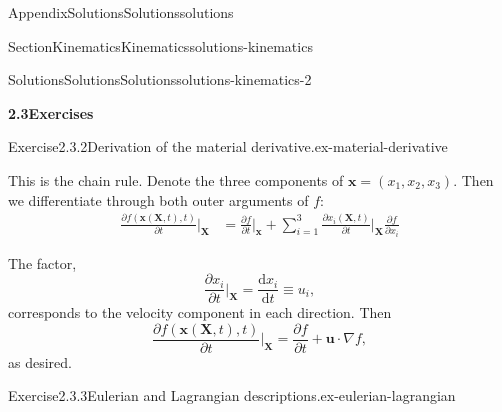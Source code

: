 \documentclass[oneside,10pt,]{book}
\newcommand{\ptxappendixperiodchapter}{}
\numberwithin{equation}{section}
\providecommand\phantomsection{}
\newcommand{\de}{\mathrm{d}}
\newcommand{\dd}[2]{\frac{\de#1}{\de#2}}
\newcommand{\pd}[2]{\frac{\partial#1}{\partial#2}}
\newcommand{\bx}{\boldsymbol{x}}
\newcommand{\bX}{\boldsymbol{X}}
\newcommand{\bu}{\boldsymbol{u}}
\begin{document}
%
\appendix%
\addtocontents{toc}{\protect\renewcommand{\protect\ptxappendixperiodchapter}{.}}%
%
\clearpage\phantomsection%
%
%
%
\typeout{************************************************}
\typeout{************************************************}
%
\begin{appendixptx}{Appendix}{Solutions}{}{Solutions}{}{}{solutions}
\renewcommand*{\appendixname}{Appendix}
%
%
\typeout{************************************************}
\typeout{************************************************}
%
\begin{sectionptx}{Section}{Kinematics}{}{Kinematics}{}{}{solutions-kinematics}
%
%
\typeout{************************************************}
\typeout{************************************************}
%
\begin{solutions-subsection-numberless}{Solutions}{Solutions}{}{Solutions}{}{}{solutions-kinematics-2}
\par\medskip
\noindent\textbf{\normalsize{}2.3\space\textperiodcentered\space{}Exercises}
\begin{divisionsolution}{Exercise}{2.3.2}{Derivation of the material derivative.}{ex-material-derivative}%
\par\smallskip%
\noindent\hypertarget{ex-material-derivative-3-main}{}This is the chain rule. Denote the three components of \(\bx = (x_1, x_2, x_3)\). Then we differentiate through both outer arguments of \(f\):%
\begin{align*}
\pd{f(\bx(\bX, t), t)}{t}\biggr\rvert_{\bX} &= \pd{f}{t}\biggr\rvert_{\bx} +
\sum_{i=1}^3 \pd{x_i(\bX, t)}{t}\biggr\rvert_{\bX} \pd{f}{x_i} 
\end{align*}
%
\par
The factor,%
\begin{equation*}
\pd{x_i}{t}\biggr\rvert_{\bX} = \dd{x_i}{t} \equiv u_i,
\end{equation*}
corresponds to the velocity component in each direction. Then%
\begin{equation*}
\pd{f(\bx(\bX, t),
t)}{t}\biggr\rvert_{\bX} = \pd{f}{t} + \bu \cdot \nabla f,
\end{equation*}
as desired.%
\end{divisionsolution}%
\begin{divisionsolution}{Exercise}{2.3.3}{Eulerian and Lagrangian descriptions.}{ex-eulerian-lagrangian}%

\end{divisionsolution}
\end{solutions-subsection-numberless}
\end{sectionptx}
\end{appendixptx}
\end{document}
